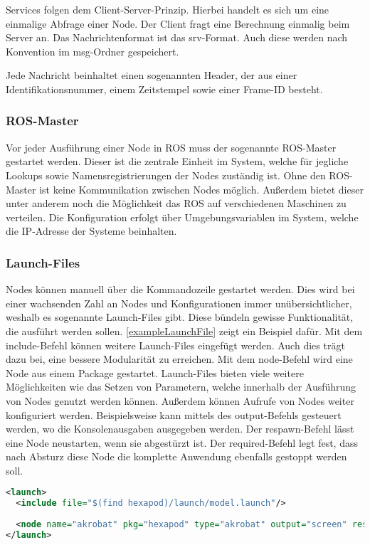Services folgen dem Client-Server-Prinzip. Hierbei handelt es sich um eine einmalige Abfrage einer Node. Der Client fragt eine Berechnung einmalig beim Server an. Das Nachrichtenformat ist das srv-Format. Auch diese werden nach Konvention im msg-Ordner gespeichert.
    
Jede Nachricht beinhaltet einen sogenannten Header, der aus einer Identifikationsnummer, einem Zeitstempel sowie einer Frame-ID besteht.

\subsubsection{ROS-Master}

Vor jeder Ausführung einer Node in \ac{ROS} muss der sogenannte \ac{ROS}-Master gestartet werden. Dieser ist die zentrale Einheit im System, welche für jegliche Lookups sowie Namensregistrierungen der Nodes zuständig ist. Ohne den \ac{ROS}-Master ist keine Kommunikation zwischen Nodes möglich. Außerdem bietet dieser unter anderem noch die Möglichkeit das \ac{ROS} auf verschiedenen Maschinen zu verteilen. Die Konfiguration erfolgt über Umgebungsvariablen im System, welche die IP-Adresse der Systeme beinhalten.

\subsubsection{Launch-Files}

Nodes können manuell über die Kommandozeile gestartet werden. Dies wird bei einer wachsenden Zahl an Nodes und Konfigurationen immer unübersichtlicher, weshalb es sogenannte Launch-Files gibt. Diese bündeln gewisse Funktionalität, die ausführt werden sollen. \autoref{exampleLaunchFile} zeigt ein Beispiel dafür. Mit dem include-Befehl können weitere Launch-Files eingefügt werden. Auch dies trägt dazu bei, eine bessere Modularität zu erreichen. Mit dem node-Befehl wird eine Node aus einem Package gestartet. Launch-Files bieten viele weitere Möglichkeiten wie das Setzen von Parametern, welche innerhalb der Ausführung von Nodes genutzt werden können. Außerdem können Aufrufe von Nodes weiter konfiguriert werden. Beispielsweise kann mittels des output-Befehls gesteuert werden, wo die Konsolenausgaben ausgegeben werden. Der respawn-Befehl lässt eine Node neustarten, wenn sie abgestürzt ist. Der required-Befehl legt fest, dass nach Absturz diese Node die komplette Anwendung ebenfalls gestoppt werden soll.

\begin{lstlisting}[label={exampleLaunchFile}, language=Xml, caption={Beispiel eines Launch-Files}]
<launch>
  <include file="$(find hexapod)/launch/model.launch"/>
  
  <node name="akrobat" pkg="hexapod" type="akrobat" output="screen" respawn="false" required="true"></node>
</launch>
\end{lstlisting}
  
